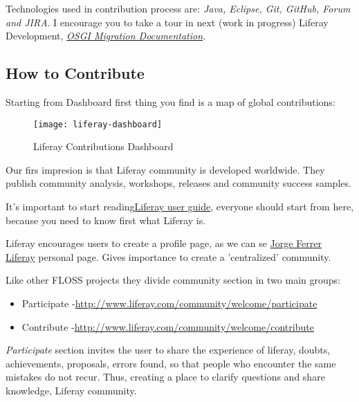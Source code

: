 \par Technologies used in contribution process are: \textit{Java, Eclipse, Git, GitHub, Forum and JIRA}. I encourage you to take a tour in next (work in progress) Liferay Development, \textit{\href{http://www.liferay.com/es/documentation/liferay-portal/6.1/user-guide/-/ai/osgi}{OSGI Migration Documentation}.}

\subsection{How to Contribute}

\par Starting from Dashboard first thing you find is a map of global contributions:

\begin{figure}[H]
    \centering
    \texttt{[image: liferay-dashboard]}
    \caption{Liferay Contributions Dashboard}
    \label{dashboard}
\end{figure}

\par Our firs impresion is that Liferay community is developed worldwide. They publish community analysis, workshops, releases and community success samples.

\par It's important to start reading\href{http://www.liferay.com/documentation/liferay-portal/6.1/user-guide}{Liferay user guide}, everyone should start from here, because you need to know first what Liferay is.

\par Liferay encourages users to create a profile page, as we can se \href{http://www.liferay.com/web/jorge.ferrer/profile}{Jorge Ferrer Liferay} personal page. Gives importance to create a 'centralized' community.

\par Like other FLOSS projects they divide community section in two main groups:

\begin{itemize}
	\item Participate -\href{http://www.liferay.com/community/welcome/participate}{http://www.liferay.com/community/welcome/participate}
	\item Contribute -\href{http://www.liferay.com/community/welcome/contribute}{http://www.liferay.com/community/welcome/contribute}
\end{itemize}

\par \textit{Participate} section invites the user to share the experience of liferay, doubts, achievements, proposals, errors found, so that people who encounter the same mistakes do not recur. Thus, creating a place to clarify questions and share knowledge, Liferay community.

